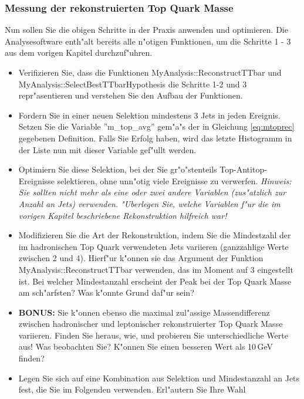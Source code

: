 \subsubsection{Messung der rekonstruierten Top Quark Masse}
Nun sollen Sie die obigen Schritte in der Praxis anwenden und optimieren. Die Analysesoftware enth"alt bereits alle n"otigen Funktionen, um die Schritte 1 - 3 aus dem vorigen Kapitel durchzuf"uhren. 

\begin{itemize}
\item Verifizieren Sie, dass die Funktionen MyAnalysis::ReconstructTTbar und MyAnalysis::SelectBestTTbarHypothesis die Schritte 1-2 und 3 repr"asentieren und verstehen Sie den Aufbau der Funktionen. 

\item Fordern Sie in einer neuen Selektion mindestens 3 Jets in jeden Ereignis. Setzen Sie die Variable ''m\_top\_avg'' gem"a"s der in Gleichung \ref{eq:mtoprec} gegebenen Definition. Falls Sie Erfolg haben, wird das letzte Histogramm in der Liste nun mit dieser Variable gef"ullt werden.

\item Optimiern Sie diese Selektion, bei der Sie gr"o"stenteils Top-Antitop-Ereignisse selektieren, ohne unn"otig viele Ereignisse zu verwerfen. \textit{Hinweis: Sie sollten nicht mehr als eine oder zwei andere Variablen (zus"atzlich zur Anzahl an Jets) verwenden. "Uberlegen Sie, welche Variablen f"ur die im vorigen Kapitel beschriebene Rekonstruktion hilfreich war!}

\item Modifizieren Sie die Art der Rekonstruktion, indem Sie die Mindestzahl der im hadronischen Top Quark verwendeten Jets variieren (ganzzahlige Werte zwischen 2 und 4). Hierf"ur k"onnen sie das Argument der Funktion MyAnalysis::ReconstructTTbar verwenden, das im Moment auf 3 eingestellt ist. Bei welcher Mindestanzahl erscheint der Peak bei der Top Quark Masse am sch"arfsten? Was k"onnte Grund daf"ur sein?

\item \textbf{BONUS:} Sie k"onnen ebenso die maximal zul"assige Massendifferenz zwischen hadronischer und leptonischer rekonstruierter Top Quark Masse variieren. Finden Sie heraus, wie, und probieren Sie unterschiedliche Werte aus! Was beobachten Sie? K"onnen Sie einen besseren Wert als 10\,GeV finden?

\item Legen Sie sich auf eine Kombination aus Selektion und Mindestanzahl an Jets fest, die Sie im Folgenden verwenden. Erl"autern Sie Ihre Wahl

\end{itemize}


